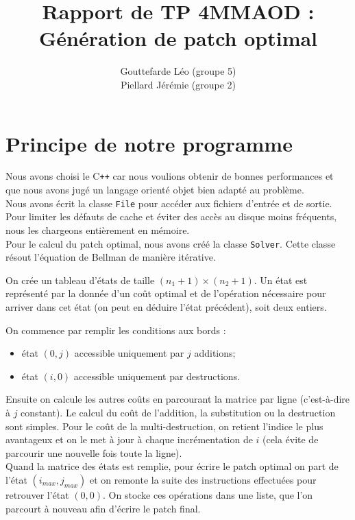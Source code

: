 \documentclass[a4paper, 10pt, french]{article}
\title{Rapport de TP 4MMAOD : Génération de patch optimal}
\author{
{\sc Gouttefarde} Léo (groupe 5)\\
{\sc Piellard} Jérémie (groupe 2)
}
\begin{document}
\maketitle

\section{Principe de notre  programme}
Nous avons choisi le C\texttt{++} car nous voulions obtenir de bonnes performances
et que nous avons jugé un langage orienté objet bien adapté au problème.\\

Nous avons écrit la classe \texttt{File} pour accéder aux fichiers d'entrée et de sortie. Pour limiter les défauts de cache et éviter des accès au disque moins fréquents, nous les chargeons entièrement en mémoire.\\

Pour le calcul du patch optimal, nous avons créé la classe \texttt{Solver}.
Cette classe résout l'équation de Bellman de manière itérative.

On crée un tableau d'états de taille $(n_1+1)\times(n_2+1)$.
Un état est représenté par la donnée d'un coût optimal et de l'opération nécessaire pour arriver dans cet état
(on peut en déduire l'état précédent), soit deux entiers.

On commence par remplir les conditions aux bords :
\begin{itemize}
\item état $(0,j)$ accessible uniquement par $j$ additions;
\item état $(i,0)$ accessible uniquement par destructions.
\end{itemize}

Ensuite on calcule les autres coûts en parcourant la matrice par ligne
(c'est-à-dire à $j$ constant).
Le calcul du coût de l'addition, la substitution ou la destruction sont simples.
Pour le coût de la multi-destruction, on retient l'indice le plus avantageux
et on le met à jour à chaque incrémentation de $i$ (cela évite de parcourir une nouvelle fois toute la ligne).\\

Quand la matrice des états est remplie, pour écrire le patch optimal on part de l'état $(i_{max}, j_{max})$
et on remonte la suite des instructions effectuées pour retrouver l'état $(0,0)$.
On stocke ces opérations dans une liste, que l'on parcourt à nouveau afin d'écrire le patch final.
\end{document}

